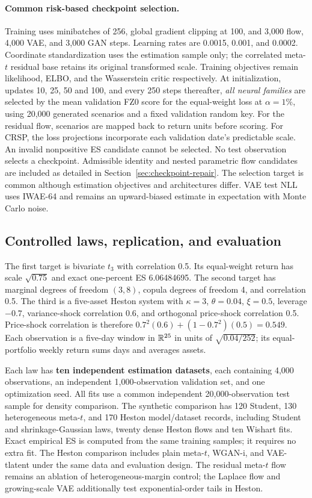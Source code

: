 \documentclass[11pt]{article}
\theoremstyle{definition}\newtheorem{definition}[theorem]{Definition}
\theoremstyle{remark}\newtheorem{remark}[theorem]{Remark}
\begin{document}
\paragraph{Common risk-based checkpoint selection.}
Training uses minibatches of 256, global gradient clipping at 100, and 3,000 flow, 4,000 VAE, and 3,000 GAN steps. Learning rates are 0.0015, 0.001, and 0.0002. Coordinate standardization uses the estimation sample only; the correlated meta-$t$ residual base retains its original transformed scale. Training objectives remain likelihood, ELBO, and the Wasserstein critic respectively. At initialization, updates 10, 25, 50 and 100, and every 250 steps thereafter, \emph{all neural families} are selected by the mean validation FZ0 score for the equal-weight loss at $\alpha=1\%$, using 20,000 generated scenarios and a fixed validation random key. For the residual flow, scenarios are mapped back to return units before scoring. For CRSP, the loss projections incorporate each validation date's predictable scale. An invalid nonpositive ES candidate cannot be selected. No test observation selects a checkpoint. Admissible identity and nested parametric flow candidates are included as detailed in Section~\ref{sec:checkpoint-repair}. The selection target is common although estimation objectives and architectures differ. VAE test NLL uses IWAE-64 and remains an upward-biased estimate in expectation with Monte Carlo noise.

\subsection{Controlled laws, replication, and evaluation}
The first target is bivariate $t_3$ with correlation 0.5. Its equal-weight return has scale $\sqrt{0.75}$ and exact one-percent ES 6.06484695. The second target has marginal degrees of freedom $(3,8)$, copula degrees of freedom 4, and correlation 0.5. The third is a five-asset Heston system with $\kappa=3$, $\theta=0.04$, $\xi=0.5$, leverage $-0.7$, variance-shock correlation 0.6, and orthogonal price-shock correlation 0.5. Price-shock correlation is therefore $0.7^2(0.6)+(1-0.7^2)(0.5)=0.549$. Each observation is a five-day window in $\mathbb R^{25}$ in units of $\sqrt{0.04/252}$; its equal-portfolio weekly return sums days and averages assets.

Each law has \textbf{ten independent estimation datasets}, each containing 4,000 observations, an independent 1,000-observation validation set, and one optimization seed. All fits use a common independent 20,000-observation test sample for density comparison. The synthetic comparison has 120 Student, 130 heterogeneous meta-$t$, and 170 Heston model/dataset records, including Student and shrinkage-Gaussian laws, twenty dense Heston flows and ten Wishart fits. Exact empirical ES is computed from the same training samples; it requires no extra fit. The Heston comparison includes plain meta-$t$, WGAN-i, and VAE-tlatent under the same data and evaluation design. The residual meta-$t$ flow remains an ablation of heterogeneous-margin control; the Laplace flow and growing-scale VAE additionally test exponential-order tails in Heston.
\end{document}
